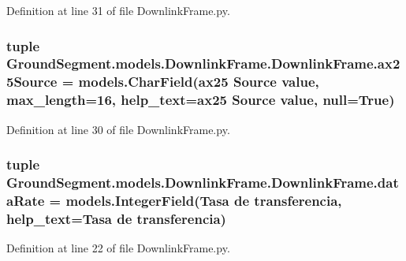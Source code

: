 Definition at line 31 of file Downlink\+Frame.\+py.

\hypertarget{class_ground_segment_1_1models_1_1_downlink_frame_1_1_downlink_frame_a64c7086161b3913498853090e1d6f721}{}
\subsubsection[{ax25\+Source}]{\setlength{\rightskip}{0pt plus 5cm}tuple Ground\+Segment.\+models.\+Downlink\+Frame.\+Downlink\+Frame.\+ax25\+Source = models.\+Char\+Field(\textquotesingle{}ax25 Source value\textquotesingle{}, max\+\_\+length=16, help\+\_\+text=\textquotesingle{}ax25 Source value\textquotesingle{}, null=True)\hspace{0.3cm}{\ttfamily [static]}}\label{class_ground_segment_1_1models_1_1_downlink_frame_1_1_downlink_frame_a64c7086161b3913498853090e1d6f721}


Definition at line 30 of file Downlink\+Frame.\+py.

\hypertarget{class_ground_segment_1_1models_1_1_downlink_frame_1_1_downlink_frame_a6f4c1351eae5c62c97a06f6fc251ac0e}{}
\subsubsection[{data\+Rate}]{\setlength{\rightskip}{0pt plus 5cm}tuple Ground\+Segment.\+models.\+Downlink\+Frame.\+Downlink\+Frame.\+data\+Rate = models.\+Integer\+Field(\textquotesingle{}Tasa de transferencia\textquotesingle{}, help\+\_\+text=\textquotesingle{}Tasa de transferencia\textquotesingle{})\hspace{0.3cm}{\ttfamily [static]}}\label{class_ground_segment_1_1models_1_1_downlink_frame_1_1_downlink_frame_a6f4c1351eae5c62c97a06f6fc251ac0e}


Definition at line 22 of file Downlink\+Frame.\+py.

